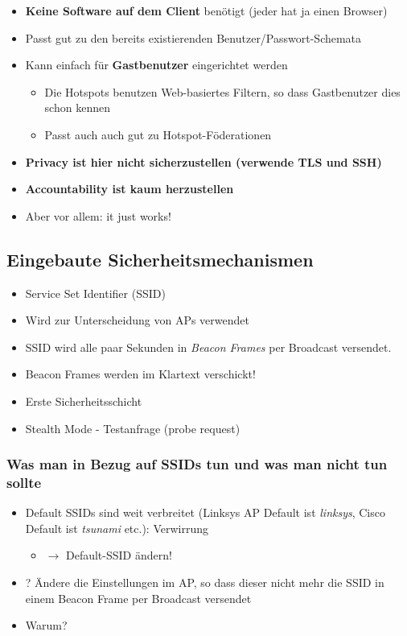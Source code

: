 \documentclass[openany]{book}
\begin{document}
\begin{itemize}
    \item \textbf{Keine Software auf dem Client} benötigt (jeder hat ja einen Browser)
    \item Passt gut zu den bereits existierenden Benutzer/Passwort-Schemata
    \item Kann einfach für \textbf{Gastbenutzer} eingerichtet werden
    \begin{itemize}
        \item Die Hotspots benutzen Web-basiertes Filtern, so dass Gastbenutzer dies schon kennen
        \item Passt auch auch gut zu Hotspot-Föderationen
    \end{itemize}
    \item \textbf{Privacy ist hier nicht sicherzustellen (verwende TLS und SSH)}
    \item \textbf{Accountability ist kaum herzustellen}
    \item Aber vor allem: it just works!
\end{itemize}

\subsection{Eingebaute Sicherheitsmechanismen}

\begin{itemize}
    \item Service Set Identifier (SSID)
    \item Wird zur Unterscheidung von APs verwendet
    \item SSID wird alle paar Sekunden in \textit{Beacon Frames} per Broadcast versendet.
    \item Beacon Frames werden im Klartext verschickt!
    \item Erste Sicherheitsschicht
    \item Stealth Mode - Testanfrage (probe request)
\end{itemize}

\subsubsection{Was man in Bezug auf SSIDs tun und was man nicht tun sollte}

\begin{itemize}
    \item Default SSIDs sind weit verbreitet (Linksys AP Default ist \textit{linksys}, Cisco Default ist \textit{tsunami} etc.): Verwirrung
    \begin{itemize}
        \item $\rightarrow$ Default-SSID ändern!
    \end{itemize}
    \item ? Ändere die Einstellungen im AP, so dass dieser nicht mehr die SSID in einem Beacon Frame per Broadcast versendet
    \item Warum?
\end{itemize}
\end{document}
